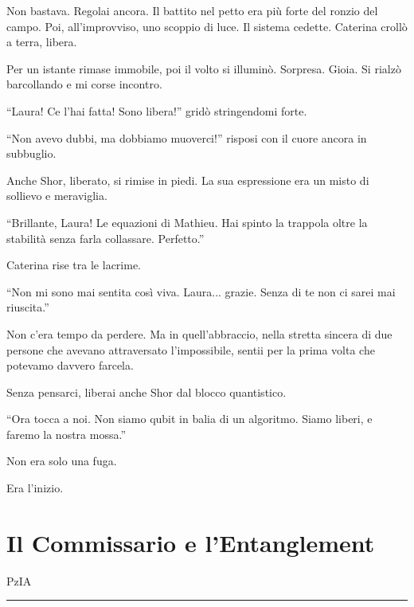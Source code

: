 Non bastava. Regolai ancora. Il battito nel petto era più forte del ronzio del campo. Poi, all’improvviso, uno scoppio di luce. Il sistema cedette.
Caterina crollò a terra, libera.

Per un istante rimase immobile, poi il volto si illuminò. Sorpresa. Gioia. Si rialzò barcollando e mi corse incontro.
\begin{dialogue}
 \enquote{Laura! Ce l’hai fatta! Sono libera!} gridò stringendomi forte.
\end{dialogue}
  \begin{dialogue}
 \enquote{Non avevo dubbi, ma dobbiamo muoverci!} risposi con il cuore ancora in subbuglio.
\end{dialogue}
Anche Shor, liberato, si rimise in piedi. La sua espressione era un misto di sollievo e meraviglia.
\begin{dialogue}
\enquote{Brillante, Laura! Le equazioni di Mathieu. Hai spinto la trappola oltre la stabilità senza farla collassare. Perfetto.}
\end{dialogue}
Caterina rise tra le lacrime.

\begin{dialogue}
 \enquote{Non mi sono mai sentita così viva. Laura... grazie. Senza di te non ci sarei mai riuscita.}
\end{dialogue}


Non c’era tempo da perdere. Ma in quell’abbraccio, nella stretta sincera di due persone che avevano attraversato l’impossibile, sentii per la prima volta che potevamo davvero farcela.

Senza pensarci, liberai anche Shor dal blocco quantistico.

\begin{dialogue}  \enquote{Ora tocca a noi. Non siamo qubit in balia di un algoritmo. Siamo liberi, e faremo la nostra mossa.} \end{dialogue}

Non era solo una fuga.

Era l'inizio.

\section{Il Commissario e l'Entanglement}
\vspace{1em}
\begin{center}PzIA\end{center}
\hrule
\vspace{1em}

